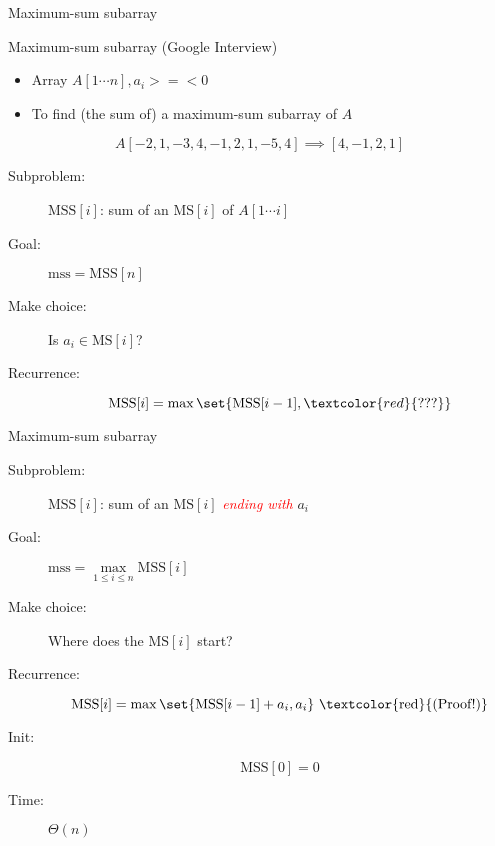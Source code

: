 
\begin{frame}{Maximum-sum subarray}
  \begin{exampleblock}{Maximum-sum subarray (Google Interview)}
    \begin{itemize}
      \item Array $A[1 \cdots n], a_{i} >=< 0$
      \item To find (the sum of) a maximum-sum subarray of $A$
    \end{itemize}
	
    \[
      A[-2,1 ,-3,4,-1,2,1,-5,4] \implies [4,-1,2,1]
    \]
  \end{exampleblock}

  \pause
  \begin{description}
    \item[Subproblem:] $\text{MSS}[i]$: sum of an $\text{MS}[i]$ of $A[1 \cdots i]$
    \item[Goal:] $\text{mss} = \text{MSS}[n]$
    \pause
    \item[Make choice:] Is $a_{i} \in \text{MS}[i]$?
    \item[Recurrence:]
      \[ 
	\text{MSS}[i] = \max \set{\text{MSS}[i-1], \textcolor{red}{???}}
      \]
  \end{description}
\end{frame}
\begin{frame}{Maximum-sum subarray}
  \begin{description}
    \item[Subproblem:] $\text{MSS}[i]$: sum of an $\text{MS}[i]$ \textcolor{red}{\it ending with} $a_{i}$
    \item[Goal:] $\text{mss} = \max\limits_{1 \le i \le n} \text{MSS}[i]$
    \pause
    \item[Make choice:] Where does the $\text{MS}[i]$ start?
    \item[Recurrence:]
      \[ 
	    \text{MSS}[i] = \max \set{\text{MSS}[i-1] + a_{i}, a_{i}} \text{ \textcolor{red}{(Proof!)}}
      \]
    \pause
    \item[Init:]
      \[
	    \text{MSS}[0] = 0
      \]
      \pause
    \item[Time:] $\Theta(n)$
  \end{description}
\end{frame}

